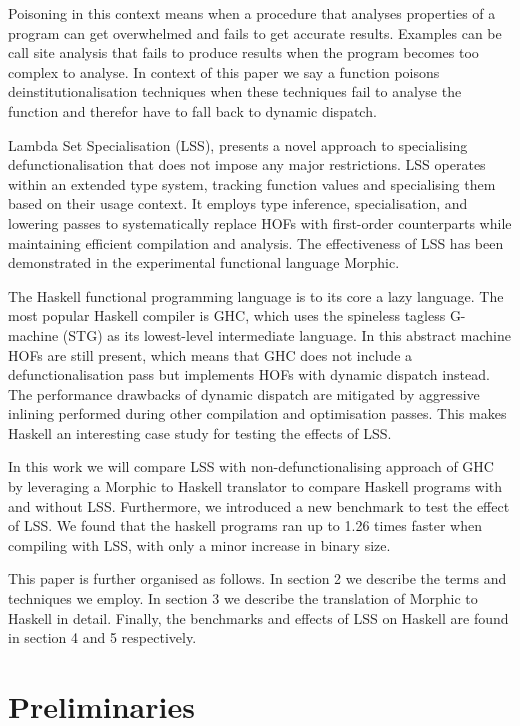 \documentclass[a4paper,UKenglish,cleveref, autoref, thm-restate]{template/lipics-v2021}
\newcommand{\hofs}{HOFs\xspace}
\newcommand{\lss}{LSS\xspace}
\begin{document}
Poisoning in this context means when a procedure that analyses properties of a program can get overwhelmed and fails to get accurate results. Examples can be call site analysis that fails to produce results when the program becomes too complex to analyse. In context of this paper we say a function poisons deinstitutionalisation techniques when these techniques fail to analyse the function and therefor have to fall back to dynamic dispatch. %

Lambda Set Specialisation \cite{brandon2023better} (\lss), presents a novel approach to specialising defunctionalisation that does not impose any major restrictions. \lss operates within an extended type system, tracking function values and specialising them based on their usage context. It employs type inference, specialisation, and lowering passes to systematically replace \hofs with first-order counterparts while maintaining efficient compilation and analysis. The effectiveness of \lss has been demonstrated in the experimental functional language Morphic.

The Haskell functional programming language is to its core a lazy language. The most popular Haskell compiler is GHC, which uses the spineless tagless G-machine (STG) \cite{peyton1989spineless} as its lowest-level intermediate language. In this abstract machine \hofs are still present, which means that GHC does not include a defunctionalisation pass but implements \hofs with dynamic dispatch instead. The performance drawbacks of dynamic dispatch are mitigated by aggressive inlining performed during other compilation and optimisation passes. This makes Haskell an interesting case study for testing the effects of \lss.

In this work we will compare \lss with non-defunctionalising approach of GHC by leveraging a Morphic to Haskell translator to compare Haskell programs with and without \lss. Furthermore, we introduced a new benchmark to test the effect of \lss. We found that the haskell programs ran up to 1.26 times faster when compiling with \lss, with only a minor increase in binary size.

This paper is further organised as follows. In section 2 we describe the terms and techniques we employ. In section 3 we describe the translation of Morphic to Haskell in detail. Finally, the benchmarks and effects of \lss on Haskell are found in section 4 and 5 respectively.

\section{Preliminaries}\label{sec:preliminaries}
\end{document}
